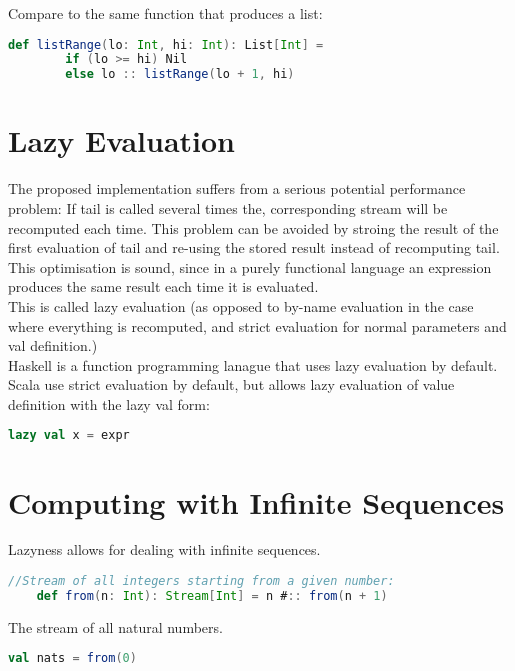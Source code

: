 \documentclass[10pt, a4paper]{report}
\begin{document}
Compare to the same function that produces a list:

\begin{lstlisting}[language=scala]
	def listRange(lo: Int, hi: Int): List[Int] = 
		if (lo >= hi) Nil
		else lo :: listRange(lo + 1, hi)
\end{lstlisting}

\section{Lazy Evaluation}

The proposed implementation suffers from a serious potential performance problem: If tail is called several times the, corresponding stream will be recomputed each time. This problem can be avoided by stroing the result of the first evaluation of tail and re-using the stored result instead of recomputing tail. This optimisation is sound, since in a purely functional language an expression produces the same result each time it is evaluated.\\

This is called lazy evaluation (as opposed to by-name evaluation in the case where everything is recomputed, and strict evaluation for normal parameters and val definition.)\\

Haskell is a function programming lanague that uses lazy evaluation by default. Scala use strict evaluation by default, but allows lazy evaluation of value definition with the lazy val form:

\begin{lstlisting}[language=scala]
	lazy val x = expr
\end{lstlisting}


\section{Computing with Infinite Sequences}

Lazyness allows for dealing with infinite sequences. 

\begin{lstlisting}[language=scala]
	//Stream of all integers starting from a given number:
	def from(n: Int): Stream[Int] = n #:: from(n + 1)
\end{lstlisting}

The stream of all natural numbers.

\begin{lstlisting}[language=scala]
	val nats = from(0)
\end{lstlisting}
\end{document}
